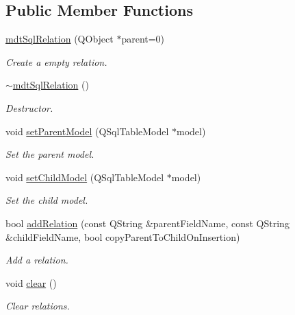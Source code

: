 \subsection*{Public Member Functions}
\begin{DoxyCompactItemize}
\item 
\hypertarget{classmdt_sql_relation_a65d9602a4663c8c356938ba9a217704f}{
\hyperlink{classmdt_sql_relation_a65d9602a4663c8c356938ba9a217704f}{mdtSqlRelation} (QObject $\ast$parent=0)}
\label{classmdt_sql_relation_a65d9602a4663c8c356938ba9a217704f}

\begin{DoxyCompactList}\small\item\em Create a empty relation. \end{DoxyCompactList}\item 
\hypertarget{classmdt_sql_relation_a22c7de1daa71abbde33199a08541310b}{
\hyperlink{classmdt_sql_relation_a22c7de1daa71abbde33199a08541310b}{$\sim$mdtSqlRelation} ()}
\label{classmdt_sql_relation_a22c7de1daa71abbde33199a08541310b}

\begin{DoxyCompactList}\small\item\em Destructor. \end{DoxyCompactList}\item 
void \hyperlink{classmdt_sql_relation_a5ac3a82c5d3e33b5e40b86acfe7e2a03}{setParentModel} (QSqlTableModel $\ast$model)
\begin{DoxyCompactList}\small\item\em Set the parent model. \end{DoxyCompactList}\item 
void \hyperlink{classmdt_sql_relation_ad74021dcf86c528044bf67220ed36833}{setChildModel} (QSqlTableModel $\ast$model)
\begin{DoxyCompactList}\small\item\em Set the child model. \end{DoxyCompactList}\item 
bool \hyperlink{classmdt_sql_relation_a58b5bcc41f6d3ecac9287672e96553bc}{addRelation} (const QString \&parentFieldName, const QString \&childFieldName, bool copyParentToChildOnInsertion)
\begin{DoxyCompactList}\small\item\em Add a relation. \end{DoxyCompactList}\item 
void \hyperlink{classmdt_sql_relation_a01469fb1baf7327ca6ddbcd1595e0d7c}{clear} ()
\begin{DoxyCompactList}\small\item\em Clear relations. \end{DoxyCompactList}\end{DoxyCompactItemize}


